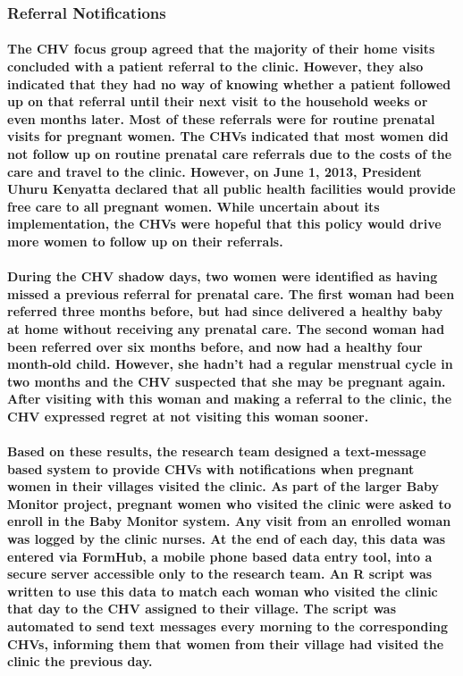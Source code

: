 \subsubsection{Referral Notifications}
\paragraph{The CHV focus group agreed that the majority of their home visits concluded with a patient referral to the clinic. However, they also indicated that they had no way of knowing whether a patient followed up on that referral until their next visit to the household weeks or even months later. Most of these referrals were for routine prenatal visits for pregnant women. The CHVs indicated that most women did not follow up on routine prenatal care referrals due to the costs of the care and travel to the clinic. However, on June 1, 2013, President Uhuru Kenyatta declared that all public health facilities would provide free care to all pregnant women. While uncertain about its implementation, the CHVs were hopeful that this policy would drive more women to follow up on their referrals. }

\paragraph{During the CHV shadow days, two women were identified as having missed a previous referral for prenatal care. The first woman had been referred three months before, but had since delivered a healthy baby at home without receiving any prenatal care. The second woman had been referred over six months before, and now had a healthy four month-old child. However, she hadn’t had a regular menstrual cycle in two months and the CHV suspected that she may be pregnant again. After visiting with this woman and making a referral to the clinic, the CHV expressed regret at not visiting this woman sooner. }

\paragraph{Based on these results, the research team designed a text-message based system to provide CHVs with notifications when pregnant women in their villages visited the clinic.  As part of the larger Baby Monitor project, pregnant women who visited the clinic were asked to enroll in the Baby Monitor system. Any visit from an enrolled woman was logged by the clinic nurses. At the end of each day, this data was entered via FormHub, a mobile phone based data entry tool, into a secure server accessible only to the research team. An R script was written to use this data to match each woman who visited the clinic that day to the CHV assigned to their village. The script was automated to send text messages every morning to the corresponding CHVs, informing them that women from their village had visited the clinic the previous day.}

